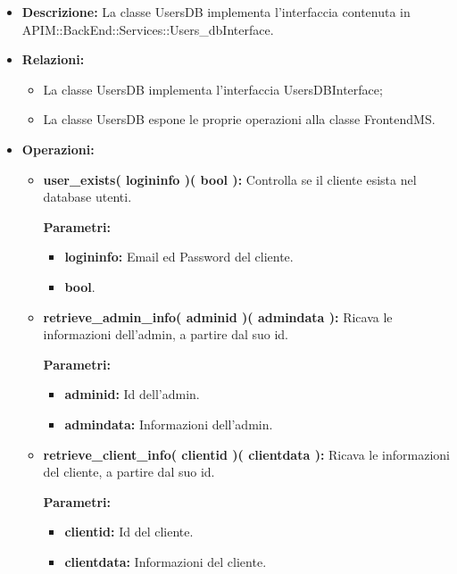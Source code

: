 \begin{itemize}
	\item \textbf{Descrizione:} La classe UsersDB implementa l'interfaccia contenuta in APIM::BackEnd::Services::Users\_dbInterface.
	\item \textbf{Relazioni:}
		\begin{itemize}
			\item La classe UsersDB implementa l'interfaccia UsersDBInterface;
			\item La classe UsersDB espone le proprie operazioni alla classe FrontendMS.
		\end{itemize}
	\item \textbf{Operazioni:}
		\begin{itemize}
		
			\item \textbf{user\_exists( logininfo )( bool ):} Controlla se il cliente esista nel database utenti.
				\begin{description}
    				\item[\textbf{Parametri:}]
				\end{description}
				\begin{itemize}
					\item \textbf{logininfo:} Email ed Password del cliente.
					\item \textbf{bool}.
				\end{itemize}
				
			\item \textbf{retrieve\_admin\_info( adminid )( admindata ):} Ricava le informazioni dell'admin, a partire dal suo id.
				\begin{description}
    				\item[\textbf{Parametri:}]
				\end{description}
				\begin{itemize}
					\item \textbf{adminid:} Id dell'admin.
					\item \textbf{admindata:} Informazioni dell'admin.
				\end{itemize}
				
			\item \textbf{retrieve\_client\_info( clientid )( clientdata ):} Ricava le informazioni del cliente, a partire dal suo id.
				\begin{description}
    				\item[\textbf{Parametri:}]
				\end{description}
				\begin{itemize}
					\item \textbf{clientid:} Id del cliente.
					\item \textbf{clientdata:} Informazioni del cliente.
				\end{itemize}
				

\end{itemize}
\end{itemize}
